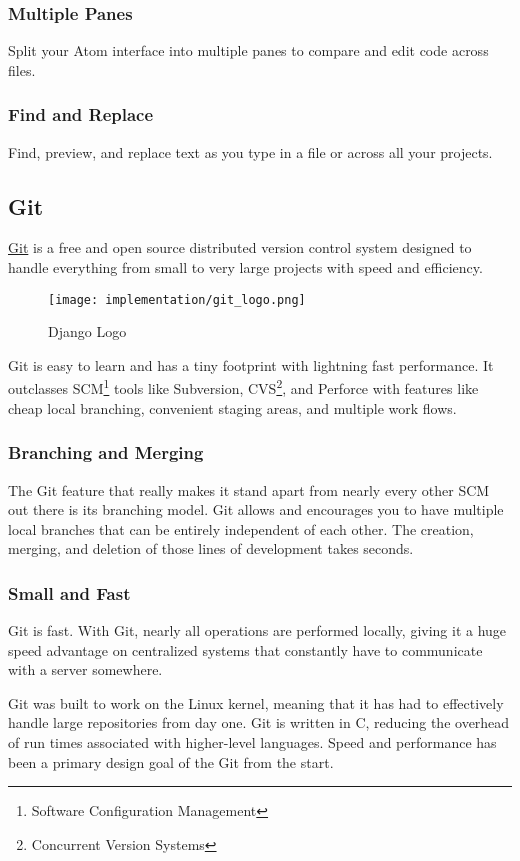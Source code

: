 	\subsubsection{Multiple Panes}
		Split your Atom interface into multiple panes to compare and edit code across files.
	\subsubsection{Find and Replace}
		Find, preview, and replace text as you type in a file or across all your projects.
		
\subsection{Git}
	\href{https://git-scm.com/}{Git} is a free and open source distributed version control system designed to handle everything from small to very large projects with speed and efficiency.
		\begin{wrapfigure}{r}{0.25\textwidth}
			\texttt{[image: implementation/git\_logo.png]}
			\caption{Django Logo}
		\end{wrapfigure}
	Git is easy to learn and has a tiny footprint with lightning fast performance. It outclasses SCM\footnote{Software Configuration Management} tools like Subversion, CVS\footnote{Concurrent Version Systems}, and Perforce with features like cheap local branching, convenient staging areas, and multiple work flows.\cite{git}
	\subsubsection{Branching and Merging}
		The Git feature that really makes it stand apart from nearly every other SCM out there is its branching model. Git allows and encourages you to have multiple local branches that can be entirely independent of each other. The creation, merging, and deletion of those lines of development takes seconds.
	\subsubsection{Small and Fast}
		Git is fast. With Git, nearly all operations are performed locally, giving it a huge speed advantage on centralized systems that constantly have to communicate with a server somewhere.
		
		Git was built to work on the Linux kernel, meaning that it has had to effectively handle large repositories from day one. Git is written in C, reducing the overhead of run times associated with higher-level languages. Speed and performance has been a primary design goal of the Git from the start.
